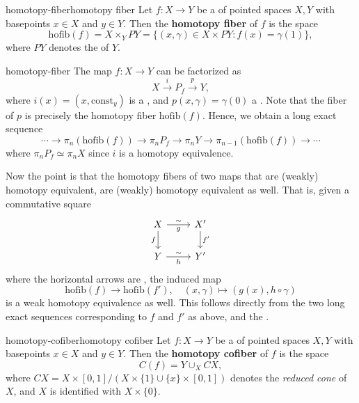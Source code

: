 \begin{topic}{homotopy-fiber}{homotopy fiber}
    Let $f : X \to Y$ be a  of pointed spaces $X, Y$ with basepoints $x \in X$ and $y \in Y$. Then the \textbf{homotopy fiber} of $f$ is the space
    \[ \text{hofib}(f) = X \times_Y P Y = \{ (x, \gamma) \in X \times P Y : f(x) = \gamma(1) \} , \]
    where $P Y$ denotes the  of $Y$.
\end{topic}

\begin{example}{homotopy-fiber}
    The map $f : X \to Y$ can be factorized as
    \[ X \xrightarrow{i} P_f \xrightarrow{p} Y , \]
    where $i(x) = (x, \text{const}_y)$ is a , and $p(x, \gamma) = \gamma(0)$ a . Note that the fiber of $p$ is precisely the homotopy fiber $\text{hofib}(f)$. Hence, we obtain a long exact sequence
    \[ \cdots \to \pi_n(\text{hofib}(f)) \to \pi_n P_f \to \pi_n Y \to \pi_{n - 1}(\text{hofib}(f)) \to \cdots \]
    where $\pi_n P_f \simeq \pi_n X$ since $i$ is a homotopy equivalence.
    
    Now the point is that the homotopy fibers of two maps that are (weakly) homotopy equivalent, are (weakly) homotopy equivalent as well. That is, given a commutative square
    \[ \begin{tikzcd} X \arrow[swap]{d}{f} \arrow["g"']{r}{\sim} & X' \arrow{d}{f'} \\ Y \arrow["h"']{r}{\sim} & Y' \end{tikzcd} \]
    where the horizontal arrows are , the induced map
    \[ \text{hofib}(f) \to \text{hofib}(f'), \quad (x, \gamma) \mapsto (g(x), h \circ \gamma) \]
    is a weak homotopy equivalence as well. This follows directly from the two long exact sequences corresponding to $f$ and $f'$ as above, and the .
\end{example}

\begin{topic}{homotopy-cofiber}{homotopy cofiber}
    Let $f : X \to Y$ be a  of pointed spaces $X, Y$ with basepoints $x \in X$ and $y \in Y$. Then the \textbf{homotopy cofiber} of $f$ is the space
    \[ C(f) = Y \cup_X CX , \]
    where $CX = X \times [0, 1] / (X \times \{ 1 \} \cup \{ x \} \times [0, 1])$ denotes the \textit{reduced cone} of $X$, and $X$ is identified with $X \times \{ 0 \}$.
\end{topic}

